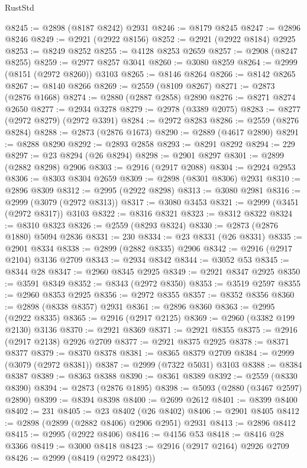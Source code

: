 \begin{lexlean}{RustStd}
\begin{coremodule}
@8245 := @2898 (@8187 @8242) @2931
@8246 := @8179 @8245
@8247 := @2896 @8246
@8249 := @2921 (@2922 @8156)
@8252 := @2921 (@2922 @8184) @2925
@8253 := @8249 @8252
@8255 := @4128 @8253 @2659
@8257 := @2908 (@8247 @8255)
@8259 := @2977 @8257 @3041
@8260 := @3080 @8259
@8264 := @2999 (@8151 (@2972 @8260)) @3103
@8265 := @8146 @8264
@8266 := @8142 @8265
@8267 := @8140 @8266
@8269 := @2559 (@8109 @8267)
@8271 := @2873 (@2876 @1668)
@8274 := @2880 (@2887 @2858) @2890
@8276 := @8271 @8274 @2650
@8277 := @2934 @3278
@8279 := @2978 (@3389 @2075)
@8283 := @8277 (@2972 @8279) (@2972 @3391)
@8284 := @2972 @8283
@8286 := @2559 (@8276 @8284)
@8288 := @2873 (@2876 @1673)
@8290 := @2889 (@4617 @2890)
@8291 := @8288 @8290
@8292 := @2893 @2858
@8293 := @8291 @8292
@8294 := 229
@8297 := @23 @8294 (@26 @8294)
@8298 := @2901 @8297
@8301 := @2899 (@2882 @8298) @2906
@8303 := @2916 (@2917 @2088)
@8304 := @2924 @2953
@8306 := @8303 @8304 @2659
@8309 := @2898 (@8301 @8306) @2931
@8310 := @2896 @8309
@8312 := @2995 (@2922 @8298)
@8313 := @3080 @2981
@8316 := @2999 (@3079 (@2972 @8313))
@8317 := @3080 @3453
@8321 := @2999 (@3451 (@2972 @8317)) @3103
@8322 := @8316 @8321
@8323 := @8312 @8322
@8324 := @8310 @8323
@8326 := @2559 (@8293 @8324)
@8330 := @2873 (@2876 @1880) @5094 @2836
@8331 := 230
@8334 := @23 @8331 (@26 @8331)
@8335 := @2901 @8334
@8338 := @2899 (@2882 @8335) @2906
@8342 := @2916 (@2917 @2104) @3136 @2709
@8343 := @2934 @8342
@8344 := @3052 @53
@8345 := @8344 @28
@8347 := @2960 @8345 @2925
@8349 := @2921 @8347 @2925
@8350 := @3591 @8349
@8352 := @8343 (@2972 @8350)
@8353 := @3519 @2597
@8355 := @2960 @8353 @2925
@8356 := @2972 @8355
@8357 := @8352 @8356
@8360 := @2898 (@8338 @8357) @2931
@8361 := @2896 @8360
@8363 := @2995 (@2922 @8335)
@8365 := @2916 (@2917 @2125)
@8369 := @2960 (@3382 @199 @2130) @3136
@8370 := @2921 @8369
@8371 := @2921 @8355
@8375 := @2916 (@2917 @2138) @2926 @2709
@8377 := @2921 @8375 @2925
@8378 := @8371 @8377
@8379 := @8370 @8378
@8381 := @8365 @8379 @2709
@8384 := @2999 (@3079 (@2972 @8381))
@8387 := @2999 (@7322 @5031) @3103
@8388 := @8384 @8387
@8389 := @8363 @8388
@8390 := @8361 @8389
@8392 := @2559 (@8330 @8390)
@8394 := @2873 (@2876 @1895)
@8398 := @5093 (@2880 (@3467 @2597) @2890)
@8399 := @8394 @8398
@8400 := @2699 @2612
@8401 := @8399 @8400
@8402 := 231
@8405 := @23 @8402 (@26 @8402)
@8406 := @2901 @8405
@8412 := @2898 (@2899 (@2882 @8406) @2906 @2951) @2931
@8413 := @2896 @8412
@8415 := @2995 (@2922 @8406)
@8416 := @4156 @53
@8418 := @8416 @28 @3366
@8419 := @3000 @8418
@8423 := @2916 (@2917 @2164) @2926 @2709
@8426 := @2999 (@8419 (@2972 @8423))

\end{coremodule}
\end{lexlean}
